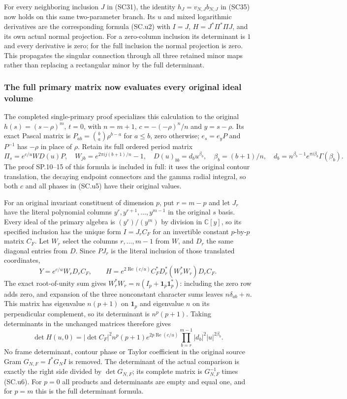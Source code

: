 For every neighboring inclusion $J$ in (SC31), the identity
$h_J=v_{N,J}b_{N,J}$ in (SC35) now holds on this same
two-parameter branch.  Its $u$ and mixed logarithmic
derivatives are the corresponding formula (SC.u2) with
$I=J$, $H=J^*\Pi^*\Pi J$, and its own actual normal
projection.  For a zero-column inclusion its determinant is
$1$ and every derivative is zero; for the full inclusion the
normal projection is zero.  This propagates the singular
connection through all three retained minor maps rather than
replacing a rectangular minor by the full determinant.

\subsubsection{The full primary matrix now evaluates every original ideal volume}
The completed single-primary proof specializes this calculation
to the original $h(s)=(s-\rho)^m$, $t=0$, with $n=m+1$,
$c=-(-\rho)^n/n$ and $y=s-\rho$.  Its exact Pascal matrix
is $P_{ab}=\binom ba\rho^{b-a}$ for $a\le b$, zero otherwise;
$e_s=e_yP$ and $P^{-1}$ has $-\rho$ in place of $\rho$.
Retain its full ordered period matrix
\[
 \Pi_s=e^{c/u}WD(u)P,\quad
 W_{jb}=e^{2\pi i j(b+1)/n}-1,\quad
 D(u)_{bb}=d_bu^{\beta_b},\quad
 \beta_b=(b+1)/n,\quad
 d_b=n^{\beta_b-1}e^{\pi i\beta_b}\Gamma(\beta_b).
 \tag{SC.u5}
\]
The proof SP.10--15 of this formula is included in full: it
uses the original contour translation, the decaying endpoint
connectors and the gamma radial integral, so both $c$ and all
phases in (SC.u5) have their original values.

For an original invariant constituent of dimension $p$, put
$r=m-p$ and let $J_r$ have the literal polynomial columns
$y^r,y^{r+1},\ldots,y^{m-1}$ in the original $s$ basis.
Every ideal of the primary algebra is $(y^r)/(y^m)$ by
division in $\mathbb C[y]$, so its specified inclusion has
the unique form $I=J_r C_F$ for an invertible constant
$p$-by-$p$ matrix $C_F$.  Let $W_r$ select the columns
$r,\ldots,m-1$ from $W$, and $D_r$ the same diagonal entries
from $D$.  Since $PJ_r$ is the literal inclusion of those
translated coordinates,
\[
 Y=e^{c/u}W_rD_r C_F,\qquad
 H=e^{2\operatorname{Re}(c/u)}
            C_F^*D_r^*(W_r^*W_r)D_r C_F.             \tag{SC.u6}
\]
The exact root-of-unity sum gives
$W_r^*W_r=n(I_p+\mathbf1_p\mathbf1_p^*)$:
including the zero row adds zero, and expansion of the
three nonconstant character sums leaves $n\delta_{ab}+n$.
This matrix has eigenvalue $n(p+1)$ on $\mathbf1_p$
and eigenvalue $n$ on its perpendicular complement, so
its determinant is $n^p(p+1)$.  Taking determinants in
the unchanged matrices therefore gives
\[
 \boxed{\det H(u,0)=|\det C_F|^2 n^p(p+1)
       e^{2p\operatorname{Re}(c/u)}
       \prod_{b=r}^{m-1}|d_b|^2|u|^{2\beta_b}.}       \tag{SC.u7}
\]
No frame determinant, contour phase or Taylor coefficient
in the original source Gram $G_{N,F}=I^*G_NI$ is removed.
The determinant of the actual comparison is exactly
the right side divided by $\det G_{N,F}$; its complete
matrix is $G_{N,F}^{-1}$ times (SC.u6).
For $p=0$ all products and determinants are empty and equal
one, and for $p=m$ this is the full determinant formula.

